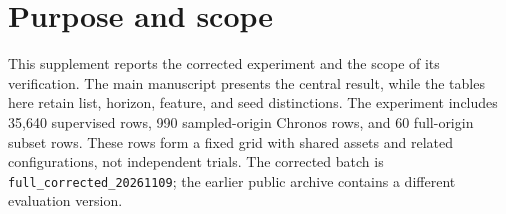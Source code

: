 \section{Purpose and scope}

This supplement reports the corrected experiment and the scope of its verification. The main manuscript presents the central result, while the tables here retain list, horizon, feature, and seed distinctions. The experiment includes 35,640 supervised rows, 990 sampled-origin Chronos rows, and 60 full-origin subset rows. These rows form a fixed grid with shared assets and related configurations, not independent trials. The corrected batch is \texttt{full\_corrected\_20261109}; the earlier public archive contains a different evaluation version.
